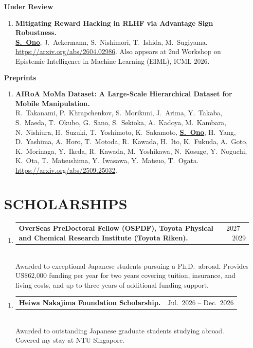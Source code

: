 \documentclass[11pt,a4paper]{article}
\makeatletter
\newcommand{\entry}[2]{%
  \noindent\begin{tabularx}{\linewidth}{@{}Xr@{}}#1 & #2\end{tabularx}%
}
\makeatother
\begin{document}
\noindent\textbf{Under Review}
\begin{enumerate}[leftmargin=2em]
	\item \textbf{Mitigating Reward Hacking in RLHF via Advantage Sign Robustness.}\\
	      \textbf{\underline{S.\ Ono}}, J.\ Ackermann, S.\ Nishimori, T.\ Ishida, M.\ Sugiyama.
	      \href{https://arxiv.org/abs/2604.02986}{https://arxiv.org/abs/2604.02986}.
	      Also appears at 2nd Workshop on Epistemic Intelligence in Machine Learning (EIML), ICML 2026.
\end{enumerate}

\noindent\textbf{Preprints}
\begin{enumerate}[leftmargin=2em]
	\item \textbf{AIRoA MoMa Dataset: A Large-Scale Hierarchical Dataset for Mobile Manipulation.}\\
	      R.\ Takanami, P.\ Khrapchenkov, S.\ Morikuni, J.\ Arima, Y.\ Takaba, S.\ Maeda, T.\ Okubo,
	      G.\ Sano, S.\ Sekioka, A.\ Kadoya, M.\ Kambara, N.\ Nishiura, H.\ Suzuki, T.\ Yoshimoto,
	      K.\ Sakamoto, \textbf{\underline{S.\ Ono}}, H.\ Yang, D.\ Yashima, A.\ Horo, T.\ Motoda, R.\ Kawada,
	      H.\ Ito, K.\ Fukuda, A.\ Goto, K.\ Morinaga, Y.\ Ikeda, R.\ Kawada, M.\ Yoshikawa,
	      N.\ Kosuge, Y.\ Noguchi, K.\ Ota, T.\ Matsushima, Y.\ Iwasawa, Y.\ Matsuo, T.\ Ogata.
	      \href{https://arxiv.org/abs/2509.25032}{https://arxiv.org/abs/2509.25032}.
\end{enumerate}

\section{SCHOLARSHIPS}
\begin{enumerate}[leftmargin=2em, start=2]
	\item \entry{\textbf{OverSeas PreDoctoral Fellow (OSPDF), Toyota Physical and Chemical Research Institute (Toyota Riken).}}{2027 -- 2029}\\
	      Awarded to exceptional Japanese students pursuing a Ph.D.\ abroad. Provides US\$62{,}000 funding per year
	      for two years covering tuition, insurance, and living costs, and up to three years of additional funding support.
\end{enumerate}
\vspace{-\topsep}
\begin{enumerate}[leftmargin=2em]
	\item \entry{\textbf{Heiwa Nakajima Foundation Scholarship.}}{Jul.\ 2026 -- Dec.\ 2026}\\
	      Awarded to outstanding Japanese graduate students studying abroad. Covered my stay at NTU Singapore.
\end{enumerate}
\end{document}
